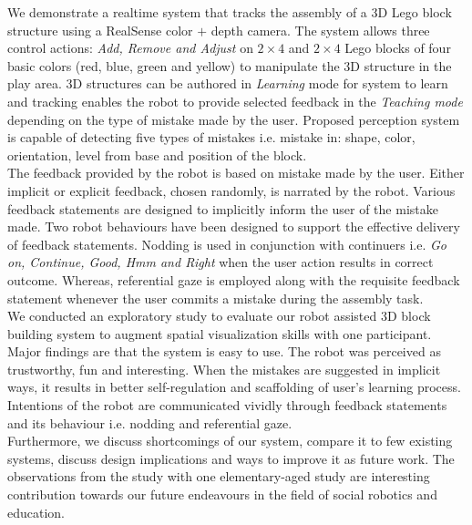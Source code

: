 %
We demonstrate a realtime system that tracks the assembly of a 3D Lego\textsuperscript\textregistered{} block structure using a RealSense\textsuperscript\textregistered{} color $+$ depth camera. The system allows three control actions: \emph{Add, Remove and Adjust} on $2 \times 4 $ and $2 \times 4 $ Lego\textsuperscript\textregistered{} blocks of four basic colors (red, blue, green and yellow) to manipulate the 3D structure in the play area. 3D structures can be authored in \emph{Learning} mode for system to learn and tracking enables the robot to provide selected feedback in the \emph{Teaching mode} depending on the type of mistake made by the user. Proposed perception system is capable of detecting five types of mistakes i.e. mistake in: shape, color, orientation, level from base and position of the block.\\
The feedback provided by the robot is based on mistake made by the user. Either implicit or explicit feedback, chosen randomly, is narrated by the robot. Various feedback statements are designed to implicitly inform the user of the mistake made. Two robot behaviours have been designed to support the effective delivery of feedback statements. Nodding is used in conjunction with continuers i.e. \emph{Go on, Continue, Good, Hmm and Right} when the user action results in correct outcome. Whereas, referential gaze is employed along with the requisite feedback statement whenever the user commits a mistake during the assembly task. \\
We conducted an exploratory study to evaluate our robot assisted 3D block building system to augment spatial visualization skills with one participant. Major findings are that the system is easy to use. The robot was perceived as trustworthy, fun and interesting. When the mistakes are suggested in implicit ways, it results in better self-regulation and scaffolding of user's learning process. Intentions of the robot are communicated vividly through feedback statements and its behaviour i.e. nodding and referential gaze. \\
Furthermore, we discuss shortcomings of our system, compare it to few existing systems, discuss design implications and ways to improve it as future work. The observations from the study with one elementary-aged study are interesting contribution towards our future endeavours in the field of social robotics and education. 
%
